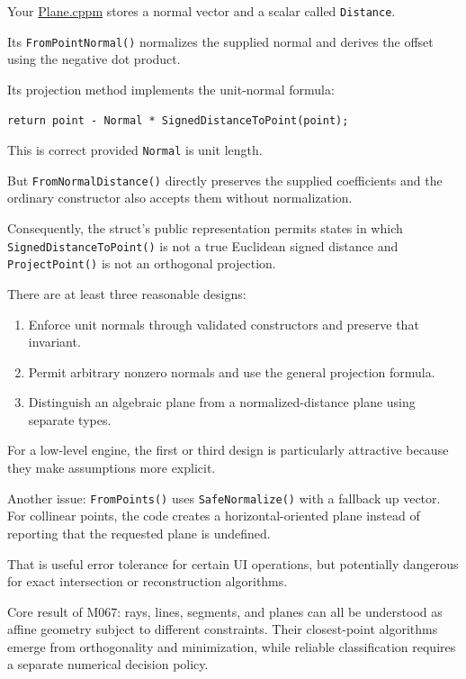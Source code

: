 Your \href{https://github.com/swayam8624/KairoGeometry/blob/master/Plane.cppm?utm_source=chatgpt.com}{Plane.cppm} stores a normal vector and a scalar called \texttt{Distance}.

Its \texttt{FromPointNormal()} normalizes the supplied normal and derives the offset using the negative dot product.

Its projection method implements the unit-normal formula:

\begin{verbatim}
return point - Normal * SignedDistanceToPoint(point);
\end{verbatim}

This is correct provided \texttt{Normal} is unit length.

But \texttt{FromNormalDistance()} directly preserves the supplied coefficients and the ordinary constructor also accepts them without normalization.

Consequently, the struct's public representation permits states in which \texttt{SignedDistanceToPoint()} is not a true Euclidean signed distance and \texttt{ProjectPoint()} is not an orthogonal projection.

There are at least three reasonable designs:

\begin{enumerate}
\def\labelenumi{\arabic{enumi}.}
\tightlist
\item
  Enforce unit normals through validated constructors and preserve that invariant.
\item
  Permit arbitrary nonzero normals and use the general projection formula.
\item
  Distinguish an algebraic plane from a normalized-distance plane using separate types.
\end{enumerate}

For a low-level engine, the first or third design is particularly attractive because they make assumptions more explicit.

Another issue: \texttt{FromPoints()} uses \texttt{SafeNormalize()} with a fallback up vector. For collinear points, the code creates a horizontal-oriented plane instead of reporting that the requested plane is undefined.

That is useful error tolerance for certain UI operations, but potentially dangerous for exact intersection or reconstruction algorithms.

Core result of M067: rays, lines, segments, and planes can all be understood as affine geometry subject to different constraints. Their closest-point algorithms emerge from orthogonality and minimization, while reliable classification requires a separate numerical decision policy.

